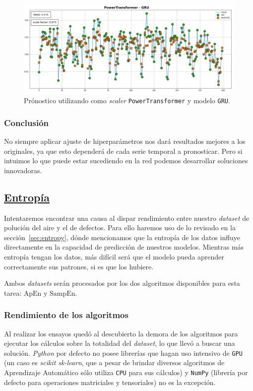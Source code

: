 \documentclass[a4paper,12pt]{article}
\begin{document}
\begin{figure}[H]
	\begin{center}
	\includegraphics[width=1\textwidth]{powertrafo_forecast.png}
  	\caption{Prónostico utilizando como \textit{scaler} \texttt{PowerTransformer} y modelo \texttt{GRU}.}
  	\label{fig:powertrafo_forecast}
  	\end{center}
\end{figure}

\subsubsection{Conclusión}
No siempre aplicar ajuste de hiperparámetros nos dará resultados mejores a los originales, ya que esto dependerá de cada serie temporal a pronosticar. Pero si intuimos lo que puede estar sucediendo en la red podemos desarrollar soluciones innovadoras.

\subsection{\href{https://github.com/GeraCollante/tesis-icomp-machinelearning/blob/main/EntropyModel.ipynb}{\color{blue}Entropía}}
Intentaremos encontrar una causa al dispar rendimiento entre nuestro \textit{dataset} de polución del aire y el de defectos. Para ello haremos uso de lo revisado en la sección~\ref{sec:entropy}, dónde mencionamos que la entropía de los datos influye directamente en la capacidad de predicción de nuestros modelos. Mientras más entropía tengan los datos, más difícil será que el modelo pueda aprender correctamente sus patrones, si es que los hubiere.

Ambos \textit{datasets} serán procesados por los dos algoritmos disponibles para esta tarea: $\textrm{ApEn}$ y $\textrm{SampEn}$.

\subsubsection{Rendimiento de los algoritmos}
Al realizar los ensayos quedó al descubierto la demora de los algoritmos para ejecutar los cálculos sobre la totalidad del \textit{dataset}, lo que llevó a buscar una solución. \textit{Python} por defecto no posee librerías que hagan uso intensivo de \texttt{GPU} (un caso es \textit{scikit sk-learn}, que a pesar de brindar diversos algoritmos de Aprendizaje Automático sólo utiliza \texttt{CPU} para sus cálculos) y \texttt{NumPy} (librería por defecto para operaciones matriciales y tensoriales) no es la excepción.
\end{document}
